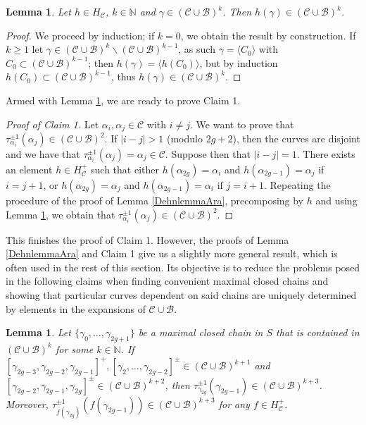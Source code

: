 \documentclass[twoside,11pt,a4paper]{article}
\newtheorem{Lema}[Def]{Lemma}
\newcommand*{\nat}{\mathbb{N}}
\newcommand*{\Cf}{\mathscr{C}}
\newcommand*{\Bf}{\mathscr{B}}
\newcommand*{\Hcf}{H_{\Cf}}
\newcommand*{\Hcp}{\Hcf^{+}}
\begin{document}
\begin{Lema}\label{translema}
 Let $h \in H_{\Cf}$, $k \in \nat$ and $\gamma \in (\Cf \cup \Bf)^{k}$. Then $h(\gamma) \in (\Cf \cup \Bf)^{k}$.
\end{Lema}
\begin{proof}
 We proceed by induction; if $k = 0$, we obtain the result by construction. If $k \geq 1$ let $\gamma \in (\Cf \cup \Bf)^{k} \backslash (\Cf \cup \Bf)^{k-1}$, as such $\gamma = \langle C_{0} \rangle$ with $C_{0} \subset (\Cf \cup \Bf)^{k-1}$; then $h(\gamma) = \langle h(C_{0})\rangle$, but by induction $h(C_{0}) \subset (\Cf \cup \Bf)^{k-1}$, thus $h(\gamma) \in (\Cf \cup \Bf)^{k}$.
\end{proof}
\indent Armed with Lemma \ref{translema}, we are ready to prove Claim 1.\\
\begin{proof}[Proof of Claim 1] Let $\alpha_{i}, \alpha_{j} \in \Cf$ with $i \neq j$. We want to prove that $\tau_{\alpha_{i}}^{\pm 1}(\alpha_{j}) \in (\Cf \cup \Bf)^{2}$. If $|i -j| > 1$ (modulo $2g+2$), then the curves are disjoint and we have that $\tau_{\alpha_{i}}^{\pm 1}(\alpha_{j}) = \alpha_{j} \in \Cf$. Suppose then that $|i-j| = 1$. There exists an element $h \in \Hcp$ such that either $h(\alpha_{2g}) = \alpha_{i}$ and $h(\alpha_{2g-1}) = \alpha_{j}$ if $i = j+1$, or $h(\alpha_{2g}) = \alpha_{j}$ and $h(\alpha_{2g-1}) = \alpha_{i}$ if $j = i+1$. Repeating the procedure of the proof of Lemma \ref{DehnlemmaAra}, precomposing by $h$ and using Lemma \ref{translema}, we obtain that $\tau_{\alpha_{i}}^{\pm 1}(\alpha_{j}) \in (\Cf \cup \Bf)^{2}$.
\end{proof}
\indent This finishes the proof of Claim 1. However, the proofs of Lemma \ref{DehnlemmaAra} and Claim 1 give us a slightly more general result, which is often used in the rest of this section. Its objective is to reduce the problems posed in the following claims when finding convenient maximal closed chains and showing that particular curves dependent on said chains are uniquely determined by elements in the expansions of $\Cf \cup \Bf$.
\begin{Lema}\label{Dehnlemma}
 Let $\{\gamma_{0}, \ldots, \gamma_{2g+1}\}$ be a maximal closed chain in $S$ that is contained in $(\Cf \cup \Bf)^{k}$ for some $k \in \nat$. If $[\gamma_{2g-3}, \gamma_{2g-2}, \gamma_{2g-1}]^{+}, [\gamma_{2}, \ldots, \gamma_{2g-2}]^{\pm} \in (\Cf \cup \Bf)^{k+1}$ and $[\gamma_{2g-2},\gamma_{2g-1},\gamma_{2g}]^{\pm} \in (\Cf \cup \Bf)^{k+2}$, then $\tau_{\gamma_{2g}}^{\pm 1}(\gamma_{2g-1}) \in (\Cf \cup \Bf)^{k+3}$. Moreover, $\tau_{f(\gamma_{2g})}^{\pm 1}(f(\gamma_{2g-1})) \in (\Cf \cup \Bf)^{k+3}$ for any $f \in \Hcp$.
\end{Lema}
\end{document}
